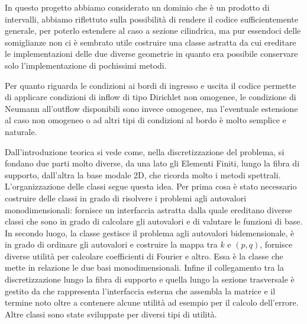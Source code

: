 In questo progetto abbiamo considerato un dominio che \`e un prodotto di intervalli, abbiamo riflettuto sulla possibilit\`a di rendere il 
codice sufficientemente generale, per poterlo estendere al caso a sezione cilindrica, ma pur essendoci delle somiglianze 
non ci \`e sembrato utile costruire una classe astratta da cui ereditare le implementazioni delle due diverse geometrie 
in quanto era possibile conservare solo l'implementazione di pochissimi metodi.

Per quanto riguarda le condizioni ai bordi di ingresso e uscita il codice permette di applicare 
condizioni di inflow di tipo Dirichlet non omogenee, le condizione di Neumann all'outflow 
disponibili sono invece  omogenee, ma l'eventuale estensione al caso non omogeneo o ad altri tipi di condizioni 
al bordo \`e molto semplice e naturale.

Dall'introduzione teorica si vede come, nella discretizzazione del problema, si fondano due parti molto diverse, 
da una lato gli Elementi Finiti, lungo la fibra di supporto, dall'altra la base modale 2D, che ricorda molto i metodi spettrali. 
L'organizzazione delle classi segue questa idea. Per prima cosa \`e stato necessario costruire delle classi in grado di risolvere
i problemi agli autovalori monodimensionali:  fornisce un interfaccia astratta
dalla quale ereditano diverse classi che sono in grado di calcolare gli autovalori e di valutare le funzioni di base.
In secondo luogo, la classe  gestisce il problema agli autovalori bidemensionale,
\`e in grado di ordinare gli autovalori e costruire la mappa tra $k$ e $(p,q)$, fornisce diverse utilit\`a
per calcolare coefficienti di Fourier e altro. Essa \`e la classe che mette in relazione le due basi monodimensionali. 
Infine il collegamento tra la discretizzazione lungo la fibra di supporto e quella lungo la sezione trasversale
\`e gestito da  che rappresenta l'interfaccia esterna che assembla la matrice e il termine 
noto oltre a contenere alcune utilit\`a ad esempio per il calcolo dell'errore.
Altre classi sono state sviluppate per diversi tipi di utilit\`a.

